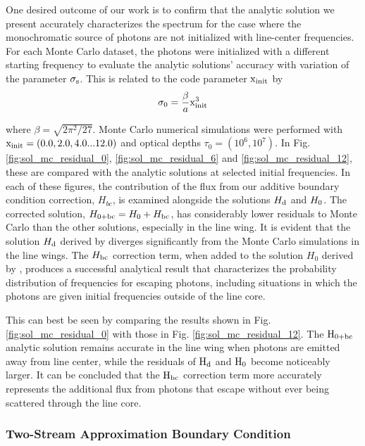 \documentclass[onecolumn]{aastex63}
\begin{document}
One desired outcome of our work is to confirm that the analytic solution we present accurately characterizes the spectrum for the case where the monochromatic source of photons are not initialized with line-center frequencies. For each Monte Carlo dataset, the photons were initialized with a different starting frequency to evaluate the analytic solutions' accuracy with variation of the parameter $\rm \sigma_s$. This is related to the code parameter $\rm x_{init}$ by 
\begin{equation} \label{sigma0_xinit}
    \sigma_0 = \frac{\beta}{a} \rm x_{init}^3
\end{equation}

where $\beta = \sqrt{2 \pi ^2 / 27}$. Monte Carlo numerical simulations were performed with $\rm x_{init} = (0.0, 2.0, 4.0 ... 12.0)$ and optical depths $\tau_0 = (10^6, 10^7)$. In Fig. \ref{fig:sol_mc_residual_0}, \ref{fig:sol_mc_residual_6} and \ref{fig:sol_mc_residual_12}, these are compared with the analytic solutions at selected initial frequencies. In each of these figures, the contribution of the flux from our additive boundary condition correction, $H_{bc}$, is examined alongside the solutions $H_{\rm d}$ and $H_{\rm 0}$. The corrected solution, $H_{\rm 0 + bc} = H_{\rm 0} + H_{\rm bc}$, has considerably lower residuals to Monte Carlo than the other solutions, especially in the line wing. It is evident that the solution $H_{\rm d}$ derived by \citet{harrington1973} diverges significantly from the Monte Carlo simulations in the line wings. The $H_{\rm bc}$ correction term, when added to the solution $H_0$ derived by \citet{2006ApJ...649...14D}, produces a successful analytical result that characterizes the probability distribution of frequencies for escaping photons, including situations in which the photons are given initial frequencies outside of the line core.

This can best be seen by comparing the results shown in Fig. \ref{fig:sol_mc_residual_0} with those in Fig. \ref{fig:sol_mc_residual_12}. The $\rm H_{0+bc}$ analytic solution remains accurate in the line wing when photons are emitted away from line center, while the residuals of $\rm H_d$ and $\rm H_0$ become noticeably larger. It can be concluded that the $\rm H_{bc}$ correction term more accurately represents the additional flux from photons that escape without ever being scattered through the line core.

\subsubsection{Two-Stream Approximation Boundary Condition}
\end{document}
